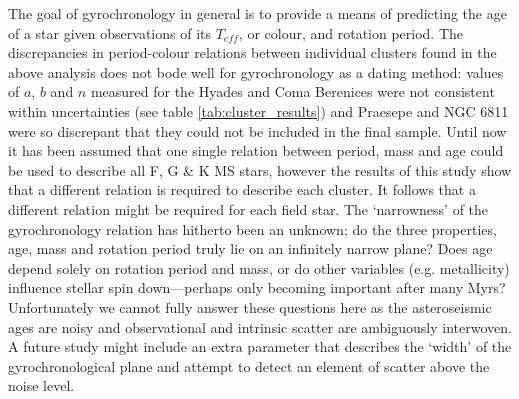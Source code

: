 \documentclass[10pt,preprint]{aastex}
\newcommand{\teff}{$T_{eff}$}
\begin{document}

The goal of gyrochronology in general is to provide a means of predicting the age of a star given observations of its \teff, or colour, and rotation period.
The discrepancies in period-colour relations between individual clusters found in the above analysis does not bode well for gyrochronology as a dating method: values of $a$, $b$ and $n$ measured for the Hyades and Coma Berenices were not consistent within uncertainties (see table \ref{tab:cluster_results}) and Praesepe and NGC 6811 were so discrepant that they could not be included in the final sample.
Until now it has been assumed that one single relation between period, mass and age could be used to describe all F, G \& K MS stars, however the results of this study show that a different relation is required to describe each cluster.
It follows that a different relation might be required for each field star.
The `narrowness' of the gyrochronology relation has hitherto been an unknown; do the three properties, age, mass and rotation period truly lie on an infinitely narrow plane?
Does age depend solely on rotation period and mass, or do other variables (e.g. metallicity) influence stellar spin down---perhaps only becoming important after many Myrs?
Unfortunately we cannot fully answer these questions here as the asteroseismic ages are noisy and observational and intrinsic scatter are ambiguously interwoven.
A future study might include an extra parameter that describes the `width' of the gyrochronological plane and attempt to detect an element of scatter above the noise level.
\end{document}
